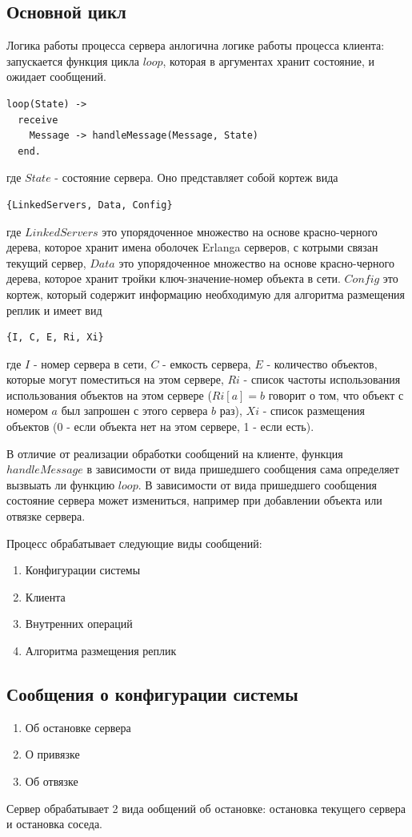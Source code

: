 		\subsection{Основной цикл}
			Логика работы процесса сервера анлогична логике работы процесса клиента: запускается функция цикла $loop$, которая в аргументах хранит состояние, и ожидает сообщений.
			\begin{lstlisting}
loop(State) ->
  receive
    Message -> handleMessage(Message, State)
  end.		
			\end{lstlisting}
			где $State$ - состояние сервера. Оно представляет собой кортеж вида
			\begin{lstlisting}
{LinkedServers, Data, Config}			
			\end{lstlisting}
			где $LinkedServers$ это упорядоченное множество на основе красно-черного дерева, которое хранит имена оболочек Erlanga серверов, с котрыми связан текущий сервер,
			$Data$ это упорядоченное множество на основе красно-черного дерева, которое хранит тройки ключ-значение-номер объекта в сети. $Config$ это кортеж, который содержит 
			информацию необходимую для алгоритма размещения реплик и имеет вид
			\begin{lstlisting}
{I, C, E, Ri, Xi}			
			\end{lstlisting}
			где $I$ - номер сервера в сети, $C$ - емкость сервера, $E$ - количество объектов, которые могут поместиться на этом сервере, $Ri$ - список частоты использования
			использования объектов на этом сервере ($Ri[a] = b$ говорит о том, что объект с номером $a$ был запрошен с этого сервера $b$ раз), $Xi$ - список размещения 
			объектов (0 - если объекта нет на этом сервере, 1 - если есть).

			В отличие от реализации обработки сообщений на клиенте, функция $handleMessage$ в зависимости от вида пришедшего сообщения сама определяет вызвыать ли функцию
			$loop$. В зависимости от вида пришедшего сообщения состояние сервера может измениться, например при добавлении объекта или отвязке сервера.

			Процесс обрабатывает следующие виды сообщений:
			\begin{enumerate}
				\item Конфигурации системы
				\item Клиента 
				\item Внутренних операций
				\item Алгоритма размещения реплик
			\end{enumerate}

		\subsection{Сообщения о конфигурации системы}
			\begin{enumerate}
				\item Об остановке сервера
				\item О привязке
				\item Об отвязке	
			\end{enumerate}
			Сервер обрабатывает 2 вида ообщений об остановке: остановка текущего сервера и остановка соседа. 
			
